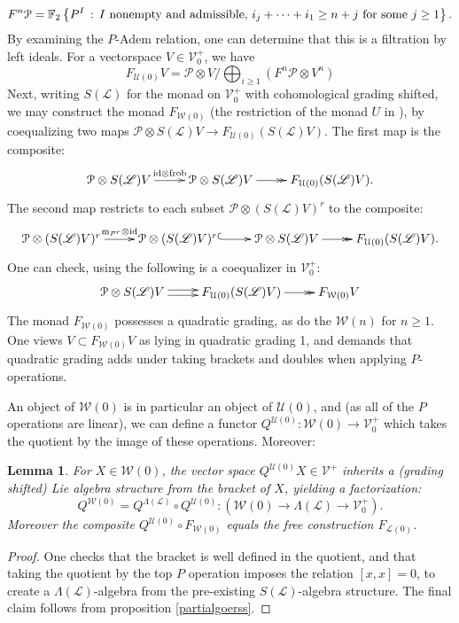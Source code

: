 \documentclass[11pt]{amsart}
\theoremstyle{plain}
\newtheorem{lem}[thm]{Lemma}
\theoremstyle{definition}
\renewcommand{\to}{\longrightarrow}
\newcommand{\scrL}{\mathscr{L}}
\newcommand{\calW}{\mathcal{W}}
\newcommand{\calU}{\mathcal{U}}
\newcommand{\calP}{\mathcal{P}}
\newcommand{\calL}{\mathcal{L}}
\newcommand{\calV}{\mathcal{V}}
\theoremstyle{plain}
\newcommand{\Palg}{{\calP}}
\newcommand{\LieOperad}{{\scrL}}
\newcommand{\vect}[2]{\calV^{#1}_{#2}}
\newcommand{\F}{\mathbb{F}}
\newcommand{\Id}{\textup{id}}
\begin{document}
\begin{Constructing (co)homotopy operations}
\begin{shaded}
\[F^n\Palg=\F_2\left\{P^I\,:\,\textup{$I$ nonempty and admissible, }i_j+\cdots +i_1\geq n+j\textup{ for some $j\geq 1$}\right\}.\]
By examining the $P$-Adem relation, one can determine that this is a filtration by left ideals. For a vectorspace $V\in\vect{+}{0}$, we have
\[F_{\calU(0)}V=\Palg\otimes V/\bigoplus_{i\geq1}(F^n\Palg\otimes V^n)\]
Next, writing $S(\LieOperad)$ for the monad on $\vect{+}{0}$ with cohomological grading shifted, we may construct the monad $F_{\calW(0)}$ (the restriction of the monad $U$ in \cite[p.\ 18]{MR1089001}), by coequalizing two maps $\Palg\otimes S(\LieOperad)V\to F_{\calU(0)} (S(\LieOperad)V)$. The first map is the composite:
\[\xymatrix@R=4mm{
\Palg\otimes S(\LieOperad)V\ar[r]^-{\Id\otimes \textup{frob}}
&%
\Palg\otimes S(\LieOperad)V\ar@{->>}[r]&%
F_{\calU(0)}(S(\LieOperad)V).%
}\]
The second map restricts to each subset $\Palg\otimes (S(\LieOperad)V)^r$ to the composite:
\[\xymatrix@R=4mm{
\Palg\otimes (S(\LieOperad)V)^r\ar[r]^-{\textup{m}_{P^r}\otimes\Id}
&
\Palg\otimes (S(\LieOperad)V)^r\ar@{^{(}->}[r]
&%
\Palg\otimes S(\LieOperad)V\ar@{->>}[r]&%
F_{\calU(0)}(S(\LieOperad)V).%
}\]
One can check, using \cite[p.\ 18]{MR1089001} the following is a coequalizer in $\vect{+}{0}$:
\[\xymatrix@R=4mm{
\Palg\otimes S(\LieOperad)V\ar@<.5ex>[r]\ar@<-.5ex>[r]
&%
F_{\calU(0)}(S(\LieOperad)V)\ar@{->>}[r]
&%
F_{\calW(0)}V%
}\]
The monad $F_{\calW(0)}$ possesses a quadratic grading, as do the $\calW(n)$ for $n\geq1$. One views $V\subset F_{\calW(0)}V$ as lying in quadratic grading 1, and demands that quadratic grading adds under taking brackets and doubles when applying $P$-operations.
\end{shaded}
An object of $\calW(0)$ is in particular an object of $\calU(0)$, and (as all of the $P$ operations are linear), we can define a functor $Q^{\calU(0)}:\calW(0)\to\vect{+}{0}$ which takes the quotient by the image of these operations. Moreover:
\begin{lem}\label{Kill P ops gives lie alg}
For $X\in\calW(0)$, the vector space $Q^{\calU(0)}X\in\vect{+}{}$ inherits a (grading shifted) Lie algebra structure from the bracket of $X$, yielding a factorization:%
\[Q^{\calW(0)}=Q^{\Lambda(\LieOperad)}\circ Q^{\calU(0)}:\left(\calW(0)\to \Lambda(\LieOperad)\to \vect{+}{0}\right).\]
Moreover the composite $Q^{\calU(0)}\circ F_{\calW(0)}$ equals the free construction $F_{\calL(0)}$.
\end{lem}
\begin{proof}
One checks that the bracket is well defined in the quotient, and that taking the quotient by the top $P$ operation imposes the relation $[x,x]=0$, to create a $\Lambda(\LieOperad)$-algebra from the pre-existing $S(\LieOperad)$-algebra structure. The final claim follows from proposition \ref{partialgoerss}.
\end{proof}


\end{Constructing (co)homotopy operations}
\end{document}
